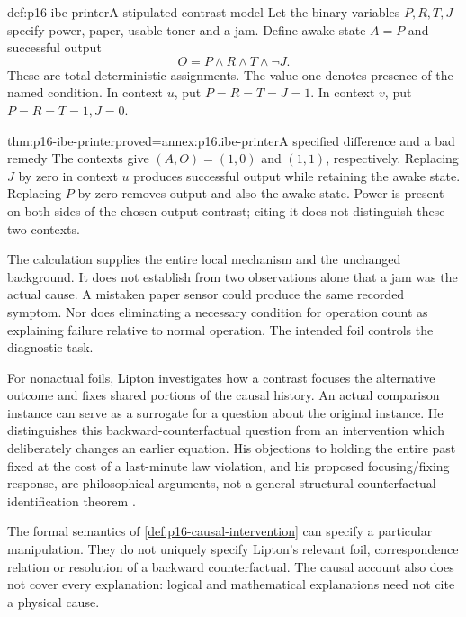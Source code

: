 \begin{hbdefinition}{def:p16-ibe-printer}{A stipulated contrast model}
Let the binary variables \(P,R,T,J\) specify power, paper, usable toner
and a jam. Define awake state \(A=P\) and successful output
\[
                    O=P\land R\land T\land\neg J.
\]
These are total deterministic assignments. The value one denotes presence
of the named condition. In context \(u\), put \(P=R=T=J=1\).
In context \(v\), put \(P=R=T=1,J=0\).
\end{hbdefinition}

\begin{hbtheorem}{thm:p16-ibe-printer}{proved=annex:p16.ibe-printer}{A specified difference and a bad remedy}
The contexts give \((A,O)=(1,0)\) and \((1,1)\), respectively.
Replacing \(J\) by zero in context \(u\) produces successful output
while retaining the awake state. Replacing \(P\) by zero removes output
and also the awake state. Power is present on both sides of the chosen
output contrast; citing it does not distinguish these two contexts.
\end{hbtheorem}

The calculation supplies the entire local mechanism and the unchanged
background. It does not establish from two observations alone that a jam
was the actual cause. A mistaken paper sensor could produce the same
recorded symptom. Nor does eliminating a necessary condition for operation
count as explaining failure relative to normal operation. The intended
foil controls the diagnostic task.

For nonactual foils, Lipton investigates how a contrast focuses the
alternative outcome and fixes shared portions of the causal history.
An actual comparison instance can serve as a surrogate for a question
about the original instance. He distinguishes this backward-counterfactual
question from an intervention which deliberately changes an earlier
equation. His objections to holding the entire past fixed at the cost
of a last-minute law violation, and his proposed focusing/fixing response,
are philosophical arguments, not a general structural counterfactual
identification theorem \cite[secs.~3--5]{Lipton1993MakingDifference}.

The formal semantics of \cref{def:p16-causal-intervention} can specify a
particular manipulation. They do not uniquely specify Lipton's relevant
foil, correspondence relation or resolution of a backward counterfactual.
The causal account also does not cover every explanation: logical and
mathematical explanations need not cite a physical cause.

